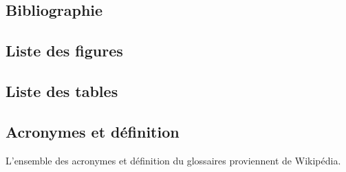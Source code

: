 \documentclass[12pt]{article}
\begin{document}
\newpage
\subsection{Bibliographie}

\nocite{*}



\newpage
\subsection{Liste des figures}
\listoffigures

\newpage
\subsection{Liste des tables}
\listoftables

\newpage
\subsection{Acronymes et définition}
L'ensemble des acronymes et définition du glossaires proviennent de Wikipédia.
\printglossaries
\end{document}
